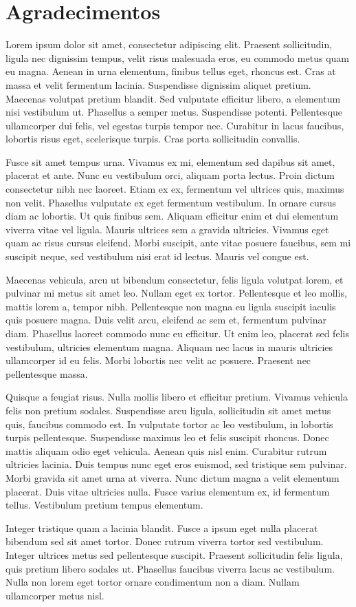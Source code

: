 \chapter{Agradecimentos}
\label{agrad}

Lorem ipsum dolor sit amet, consectetur adipiscing elit. Praesent sollicitudin, ligula nec dignissim tempus, velit risus malesuada eros, eu commodo metus quam eu magna. Aenean in urna elementum, finibus tellus eget, rhoncus est. Cras at massa et velit fermentum lacinia. Suspendisse dignissim aliquet pretium. Maecenas volutpat pretium blandit. Sed vulputate efficitur libero, a elementum nisi vestibulum ut. Phasellus a semper metus. Suspendisse potenti. Pellentesque ullamcorper dui felis, vel egestas turpis tempor nec. Curabitur in lacus faucibus, lobortis risus eget, scelerisque turpis. Cras porta sollicitudin convallis.

Fusce sit amet tempus urna. Vivamus ex mi, elementum sed dapibus sit amet, placerat et ante. Nunc eu vestibulum orci, aliquam porta lectus. Proin dictum consectetur nibh nec laoreet. Etiam ex ex, fermentum vel ultrices quis, maximus non velit. Phasellus vulputate ex eget fermentum vestibulum. In ornare cursus diam ac lobortis. Ut quis finibus sem. Aliquam efficitur enim et dui elementum viverra vitae vel ligula. Mauris ultrices sem a gravida ultricies. Vivamus eget quam ac risus cursus eleifend. Morbi suscipit, ante vitae posuere faucibus, sem mi suscipit neque, sed vestibulum nisi erat id lectus. Mauris vel congue est.

Maecenas vehicula, arcu ut bibendum consectetur, felis ligula volutpat lorem, et pulvinar mi metus sit amet leo. Nullam eget ex tortor. Pellentesque et leo mollis, mattis lorem a, tempor nibh. Pellentesque non magna eu ligula suscipit iaculis quis posuere magna. Duis velit arcu, eleifend ac sem et, fermentum pulvinar diam. Phasellus laoreet commodo nunc eu efficitur. Ut enim leo, placerat sed felis vestibulum, ultricies elementum magna. Aliquam nec lacus in mauris ultricies ullamcorper id eu felis. Morbi lobortis nec velit ac posuere. Praesent nec pellentesque massa.

Quisque a feugiat risus. Nulla mollis libero et efficitur pretium. Vivamus vehicula felis non pretium sodales. Suspendisse arcu ligula, sollicitudin sit amet metus quis, faucibus commodo est. In vulputate tortor ac leo vestibulum, in lobortis turpis pellentesque. Suspendisse maximus leo et felis suscipit rhoncus. Donec mattis aliquam odio eget vehicula. Aenean quis nisl enim. Curabitur rutrum ultricies lacinia. Duis tempus nunc eget eros euismod, sed tristique sem pulvinar. Morbi gravida sit amet urna at viverra. Nunc dictum magna a velit elementum placerat. Duis vitae ultricies nulla. Fusce varius elementum ex, id fermentum tellus. Vestibulum pretium tempus elementum.

Integer tristique quam a lacinia blandit. Fusce a ipsum eget nulla placerat bibendum sed sit amet tortor. Donec rutrum viverra tortor sed vestibulum. Integer ultrices metus sed pellentesque suscipit. Praesent sollicitudin felis ligula, quis pretium libero sodales ut. Phasellus faucibus viverra lacus ac vestibulum. Nulla non lorem eget tortor ornare condimentum non a diam. Nullam ullamcorper metus nisl. 
